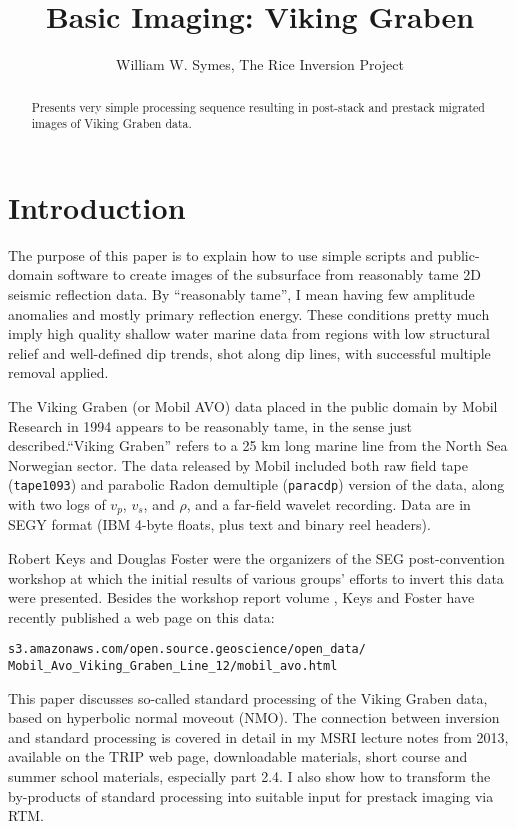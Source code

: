 \title{Basic Imaging: Viking Graben}
\date{}
\author{William W. Symes, The Rice Inversion Project}

\maketitle 
\parskip 12pt 
\begin{abstract}
Presents very simple processing sequence resulting in post-stack and prestack migrated images of Viking Graben data.
\end{abstract}


\section{Introduction}
The purpose of this paper is to explain how to use simple scripts and public-domain software to create images of the subsurface from reasonably tame 2D seismic reflection data. By ``reasonably tame'', I mean having few amplitude anomalies and mostly primary reflection energy. These conditions pretty much imply high quality shallow water marine data from regions with low structural relief and well-defined dip trends, shot along dip lines, with successful multiple removal applied.

The Viking Graben (or Mobil AVO) data placed in the public domain by Mobil Research in 1994 appears to be reasonably tame, in the sense just described.``Viking Graben'' refers to a 25 km long marine line from the North Sea Norwegian sector. The data released by Mobil included both raw field tape ({\tt tape1093}) and parabolic Radon demultiple ({\tt paracdp}) version of the data, along with two logs of $v_p$, $v_s$, and $\rho$, and a far-field wavelet recording. Data are in SEGY format (IBM 4-byte floats, plus text and binary reel headers).

Robert Keys and Douglas Foster were the organizers of the SEG post-convention workshop at which the initial results of various groups' efforts to invert this data were presented. Besides the workshop report volume \cite[]{FosterKeys:98}, Keys and Foster have recently published a web page on this data:
\begin{verbatim}
s3.amazonaws.com/open.source.geoscience/open_data/
Mobil_Avo_Viking_Graben_Line_12/mobil_avo.html
\end{verbatim}

This paper discusses so-called standard processing of the Viking Graben data, based on hyperbolic normal moveout (NMO). The connection between inversion and standard processing is covered in detail in my MSRI lecture notes from 2013, available on the TRIP web page, downloadable materials, short course and summer school materials, especially part 2.4. I also show how to transform the by-products of standard processing into suitable input for prestack imaging via RTM.

